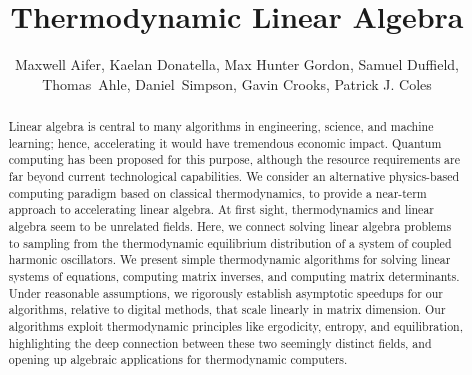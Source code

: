 \documentclass[prx,onecolumn,floatfix,longbibliography,notitlepage, nofootinbib]{revtex4-1}
\begin{document}
\title{Thermodynamic Linear Algebra}
\author{Maxwell Aifer, Kaelan Donatella, Max Hunter Gordon, Samuel Duffield, Thomas~Ahle, Daniel~Simpson, Gavin Crooks, Patrick J. Coles}


\begin{abstract}
Linear algebra is central to many algorithms in engineering, science, and machine learning; hence, accelerating it would have tremendous economic impact. Quantum computing has been proposed for this purpose, although the resource requirements are far beyond current technological capabilities. We consider an alternative physics-based computing paradigm based on classical thermodynamics, to provide a near-term approach to accelerating linear algebra. At first sight, thermodynamics and linear algebra seem to be unrelated fields. Here, we connect solving linear algebra problems to sampling from the thermodynamic equilibrium distribution of a system of coupled harmonic oscillators. We present simple thermodynamic algorithms for solving linear systems of equations, computing matrix inverses, and computing matrix determinants. Under reasonable assumptions, we rigorously establish asymptotic speedups for our algorithms, relative to digital methods, that scale linearly in matrix dimension. Our algorithms exploit thermodynamic principles like ergodicity, entropy, and equilibration, highlighting the deep connection between these two seemingly distinct fields, and opening up algebraic applications for thermodynamic computers.
\end{abstract}

\maketitle
\end{document}
